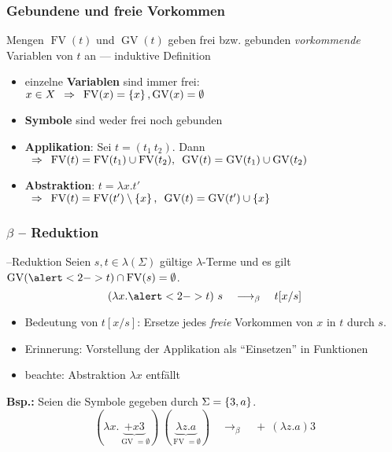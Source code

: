 \documentclass{beamer}
\DeclareMathOperator{\GV}{GV}
\DeclareMathOperator{\FV}{FV}
\begin{document}
\begin{frame} \frametitle{Gebundene und freie Vorkommen}
	Mengen $\FV(t)$ und $\GV(t)$ geben frei bzw. gebunden \textit{vorkommende} Variablen von $t$ an --- induktive Definition
	
	\pause
	
	\begin{itemize}[<+->]
		\item einzelne \textbf{Variablen} sind immer frei: \\
		$x \in X \follows \FV(x) = \menge{x} , \GV(x) = \emptyset$
		\item \textbf{Symbole} sind weder frei noch gebunden
		\item \textbf{Applikation}: Sei $t = (t_1 \  t_2)$. Dann \\
		$\follows 
		\FV(t) = \FV(t_1) \cup \FV(t_2) , \enskip
		\GV(t) = \GV(t_1) \cup \GV(t_2)$
		\item \textbf{Abstraktion}: $t = \lambda x . t'$ \\
		$\follows 
		\FV(t) = \FV(t') \setminus \menge{x} , \enskip
		\GV(t) = \GV(t') \cup \menge{x}$
	\end{itemize}
\end{frame}

\begin{frame} \frametitle{$\beta$ -- Reduktion}
	\begin{block}{\textbeta--Reduktion}
		Seien $s,t \in \lambda(\Sigma)$ gültige $\lambda$-Terme und es gilt $\GV(\alert<2->{t}) \cap \FV(s) = \emptyset$. 
		\begin{equation*}
			(\lambda x . \alert<2->{t}) \ s \quad \longrightarrow_\beta \quad t[x / s]
		\end{equation*}
	\end{block}
	
	\pause
	
	\begin{itemize}
		\item Bedeutung von $t[x / s]$: Ersetze jedes \textit{freie} Vorkommen von $x$ in $t$ durch $s$. 
		\item Erinnerung: Vorstellung der Applikation als \enquote{Einsetzen} in Funktionen
		\item beachte: Abstraktion $\lambda x$ entfällt
	\end{itemize}

	\pause
	
	\textbf{Bsp.:} Seien die Symbole gegeben durch $\Sigma = \left\{ 3,a \right\}$.
	\begin{equation*}
		(\lambda x . \underbrace{+ x 3}_{\GV = \emptyset}) \ (\underbrace{\lambda z . a}_{\FV = \emptyset}) \quad \longrightarrow_\beta \quad + \ (\lambda z . a) 3
	\end{equation*}
\end{frame}
\end{document}

